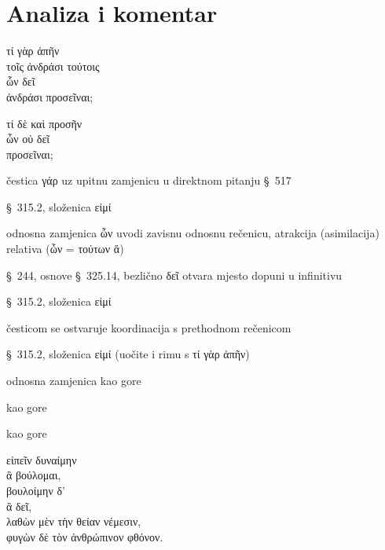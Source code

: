 \section*{Analiza i komentar}


{\large
\begin{greek}
\noindent τί γὰρ ἀπῆν \\
τοῖς ἀνδράσι τούτοις \\
\tabto{2em} ὧν δεῖ \\
\tabto{4em} ἀνδράσι προσεῖναι;

\noindent τί δὲ καὶ προσῆν \\
\tabto{2em} ὧν οὐ δεῖ \\
\tabto{4em} προσεῖναι;\\
\end{greek}
}

\begin{description}[noitemsep]
\item[τί γὰρ] čestica γάρ uz upitnu zamjenicu u direktnom pitanju §~517
\item[ἀπῆν] §~315.2, složenica εἰμί
\item[ὧν δεῖ] odnosna zamjenica ὧν uvodi zavisnu odnosnu rečenicu, atrakcija (asimilacija) relativa \textgreek{(ὧν = τούτων ἅ)}
\item[δεῖ] §~244, osnove §~325.14, bezlično δεῖ otvara mjesto dopuni u infinitivu
\item[προσεῖναι] §~315.2, složenica εἰμί
\item[τί δὲ ] česticom se ostvaruje koordinacija s prethodnom rečenicom
\item[προσῆν] §~315.2, složenica εἰμί (uočite i rimu s τί γὰρ ἀπῆν)
\item[ὧν οὐ δεῖ] odnosna zamjenica kao gore
\item[δεῖ] kao gore
\item[προσεῖναι] kao gore

\end{description}



{\large
\begin{greek}
\noindent εἰπεῖν δυναίμην \\
\tabto{2em} ἃ βούλομαι, \\
βουλοίμην δ' \\
\tabto{2em} ἃ δεῖ, \\
λαθὼν μὲν τὴν θείαν νέμεσιν, \\
φυγὼν δὲ τὸν ἀνθρώπινον φθόνον.\\

\end{greek}
}

